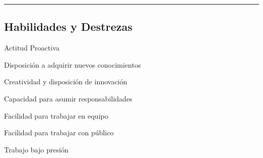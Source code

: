 \documentclass[10pt,letterpaper]{article}
\newenvironment{indentsection}[1]%
{\begin{list}{}%
	{\setlength{\leftmargin}{#1}}%
	\item[]%
}
{\end{list}}
\begin{document}

\hrule
\vspace{-0.4em}
\subsection*{Habilidades y Destrezas}

\begin{indentsection}{\parindent}
\begin{description*}

\item
  Actitud Proactiva
\item
  Disposición a adquirir nuevos conocimientos
\item
  Creatividad y disposición de innovación
\item
  Capacidad para asumir responsabilidades
\item
  Facilidad para trabajar en equipo
\item
  Facilidad para trabajar con público
\item
  Trabajo bajo presión

\end{description*}
\end{indentsection}
\end{document}
